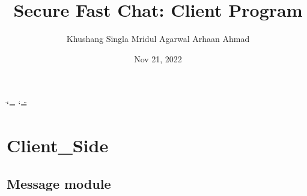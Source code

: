 \documentclass[letterpaper,10pt,english]{sphinxmanual}
\title{Secure Fast Chat: Client Program}
\date{Nov 21, 2022}
\author{Khushang Singla	Mridul Agarwal	Arhaan Ahmad}
\begin{document}
\ifdefined\shorthandoff
  \ifnum\catcode`\=\string=\active\shorthandoff{=}\fi
  \ifnum\catcode`\"=\active{}\fi
\fi

\pagestyle{empty}
\sphinxmaketitle
\pagestyle{plain}
\sphinxtableofcontents
\pagestyle{normal}
\label{\detokenize{index::doc}}


\sphinxstepscope


\chapter{Client\_Side}
\label{\detokenize{modules:client-side}}\label{\detokenize{modules::doc}}
\sphinxstepscope


\section{Message module}
\label{\detokenize{Message:module-Message}}\label{\detokenize{Message:message-module}}\label{\detokenize{Message::doc}}
\end{document}
